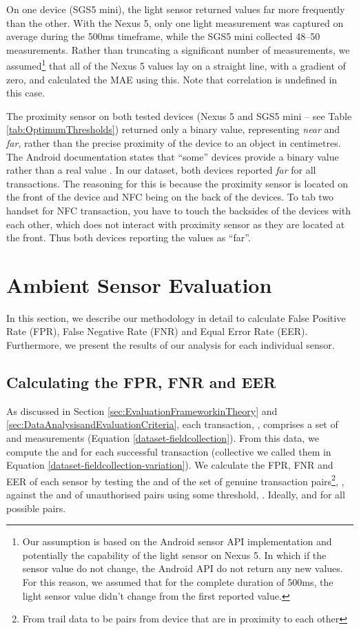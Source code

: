 \documentclass{article}
\begin{document}
 On one device (SGS5 mini), the light sensor returned values far more frequently than the other.  With the Nexus 5, only one light measurement was captured on average during the 500ms timeframe, while the SGS5 mini collected 48--50 measurements.  Rather than truncating a significant number of measurements, we assumed\footnote{Our assumption is based on the Android sensor API implementation and potentially the capability of the light sensor on Nexus 5. In which if the sensor value do not change, the Android API do not return any new values. For this reason, we assumed that for the complete duration of 500ms, the light sensor value didn't change from the first reported value.} that all of the Nexus 5 values lay on a straight line, with a gradient of zero, and calculated the MAE using this. Note that correlation is undefined in this case.

 The proximity sensor on both tested devices (Nexus 5 and SGS5 mini -- see Table \ref{tab:OptimumThresholds}) returned only a binary value, representing \emph{near} and \emph{far}, rather than the precise proximity of the device to an object in centimetres.  The Android documentation states that ``some'' devices provide a binary value rather than a real value \cite{androidposition}.  In our dataset, both devices reported \emph{far} for all transactions. The reasoning for this is because the proximity sensor is located on the front of the device and NFC being on the back of the devices. To tab two handset for NFC transaction, you have to touch the backsides of the devices with each other, which does not interact with proximity sensor as they are located at the front. Thus both devices reporting the values as ``far''.

\section{Ambient Sensor Evaluation}
\label{sec:AmbientSensorEvaluation}



In this section, we describe our methodology in detail to calculate False Positive Rate (FPR), False Negative Rate (FNR) and Equal Error Rate (EER). Furthermore, we present the results of our analysis for each individual sensor.  

\subsection{Calculating the FPR, FNR and EER}
As discussed in Section \ref{sec:EvaluationFrameworkinTheory} and
 \ref{sec:DataAnalysisandEvaluationCriteria}, each transaction, , comprises a set of  and  measurements (Equation \ref{dataset-fieldcollection}).  From this data, we compute the  and  for each successful transaction (collective we called them  in Equation \ref{dataset-fieldcollection-variation}).   We calculate the FPR, FNR and EER of each sensor by testing the  and  of the set of genuine transaction pairs\footnote{From trail data to be pairs from device that are in proximity to each other}, , against the  and  of unauthorised pairs  using some threshold, .  Ideally,  and  for all possible pairs.  
 
\end{document}

